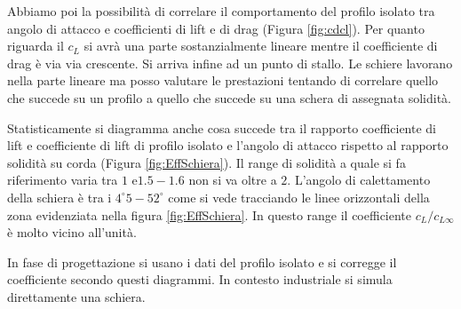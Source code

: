 Abbiamo poi la possibilità di correlare il comportamento del profilo isolato tra angolo di attacco e coefficienti di lift e di drag (Figura \ref{fig:cdcl}). Per quanto riguarda il $c_L$ si avrà una parte sostanzialmente lineare mentre il coefficiente di drag è via via crescente. Si arriva infine ad un punto di stallo. Le schiere lavorano nella parte lineare ma posso valutare le prestazioni tentando di correlare quello che succede su un profilo a quello che succede su una schera di assegnata solidità.

Statisticamente si diagramma anche cosa succede tra il rapporto coefficiente di lift e coefficiente di lift di profilo isolato e l'angolo di attacco rispetto al rapporto solidità su corda (Figura \ref{fig:EffSchiera}). 
Il range di solidità a quale si fa riferimento varia tra $1$ e$ 1.5 - 1.6$ non si va oltre a $2$. L'angolo di calettamento della schiera è tra i $4^{\circ}5 - 52^{\circ}$ come si vede tracciando le linee orizzontali della zona evidenziata nella figura \ref{fig:EffSchiera}. In questo range il coefficiente $c_L / c_{L \infty}$ è molto vicino all'unità. 

In fase di progettazione si usano i dati del profilo isolato e si corregge il coefficiente secondo questi diagrammi. In contesto industriale si simula direttamente una schiera. 


